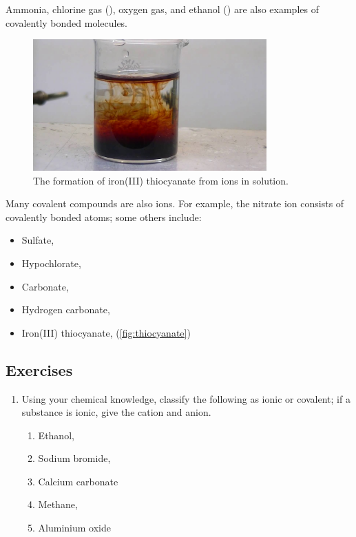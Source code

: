 \documentclass[a4paper]{memoir}
\begin{document}
\begin{center}
\end{center}

Ammonia, chlorine gas (), oxygen gas, and ethanol () are also examples of covalently bonded molecules.

\begin{figure}
  \centering
  \includegraphics[width=0.8\textwidth]{thiocyanate}
  \caption{The formation of iron(III) thiocyanate from  ions in solution.\label{fig:univindic}}
\end{figure}

Many covalent compounds are also ions. For example, the nitrate ion  consists of covalently bonded atoms; some others include:
\begin{itemize}
  \item Sulfate, 
  \item Hypochlorate, 
  \item Carbonate, 
  \item Hydrogen carbonate, 
  \item Iron(III) thiocyanate,  (\cref{fig:thiocyanate})
\end{itemize}

\subsection*{Exercises}
\begin{enumerate}
  \item Using your chemical knowledge, classify the following as ionic or covalent; if a substance is ionic, give the cation and anion.
    \begin{enumerate}
      \item Ethanol, 
      \item Sodium bromide, 
      \item Calcium carbonate
      \item Methane, 
      \item Aluminium oxide
    \end{enumerate}
\end{enumerate}
\end{document}
